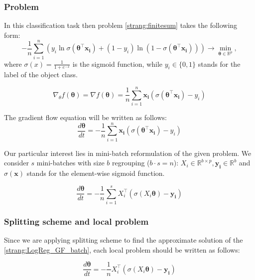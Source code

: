 \documentclass{article}
\newcommand{\vect}[1]{\boldsymbol{\mathbf{#1}}}
\begin{document}
\subsubsection{Problem}
In this classification task then problem \eqref{strang:finitesum} takes the following form:
\begin{equation}\label{strang:LogReg}
-\frac{1}{n} \sum_{i=1}^n\left(y_i \ln \sigma(\vect{\theta}^\top\vect{x_i})  + (1-y_i) \ln (1-\sigma(\vect{\theta}^\top\vect{x_i}))\right) \to \min_{\vect{\theta} \in \mathbb{R}^p},
\end{equation}
where $\sigma(x) = \frac{1}{1 + e^{-x}}$ is the sigmoid function, while $ y_i \in \{0,1\}$ stands for the label of the object class.

\begin{equation}\label{strang:LogReg_grad}
\nabla_\theta f(\vect{\theta}) = \nabla f(\vect{\theta}) = \frac{1}{n}\sum\limits_{i=1}^n \vect{x_i}(\sigma(\vect{\theta}^\top\vect{x_i}) - y_i)
\end{equation}

The gradient flow equation will be written as follows:
\begin{equation}\label{strang:LogReg_GF}
\frac{d \vect{\theta}}{d t} = - \frac{1}{n}\sum\limits_{i=1}^n \vect{x_i}(\sigma(\vect{\theta}^\top\vect{x_i}) - y_i)
\end{equation}

Our particular interest lies in mini-batch reformulation of the given problem. We consider $s$ mini-batches with size $b$ regrouping ($b \cdot s = n$): $X_i \in \mathbb{R}^{b \times p}, \vect{y_i} \in \mathbb{R}^{b}$ and  $\sigma(\vect{x})$ stands for the element-wise sigmoid function.

\begin{equation}\label{strang:LogReg_GF_batch}
\frac{d \vect{\theta}}{d t} = - \frac{1}{n}\sum\limits_{i=1}^s X_i^\top\left(\sigma\left(X_i\vect{\theta}\right) - \vect{y_i}\right)
\end{equation}

\subsubsection{Splitting scheme and local problem}

Since we are applying splitting scheme to find the approximate solution of the \eqref{strang:LogReg_GF_batch}, each local problem should be written as follows:

\begin{equation}\label{strang:LogReg_GF_local}
\frac{d \vect{\theta}}{d t} =  - \frac{1}{n} X_i^\top\left(\sigma\left(X_i\vect{\theta}\right) - \vect{y_i}\right)
\end{equation}
\end{document}
